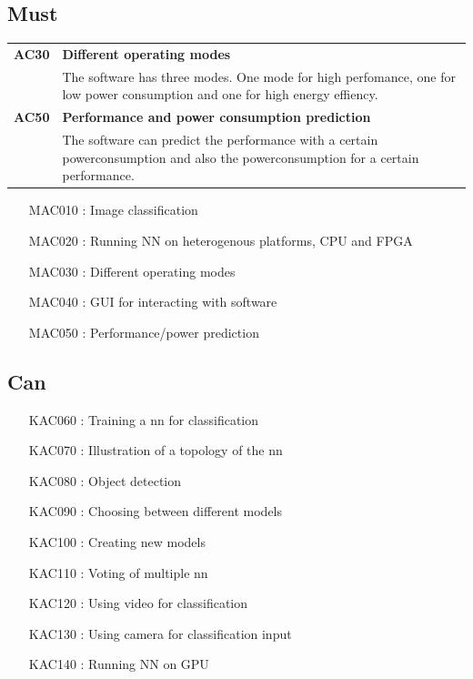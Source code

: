 \documentclass[parskip=full]{scrartcl}
\begin{document}
\subsection{Must}
\begin{tabular}{p{2cm}p{12cm}}
\textbf{AC30} & \textbf{Different operating modes} \\
& The software has three modes. One mode for high perfomance, one for low power consumption and one for high energy effiency. \\
\textbf{AC50} & \textbf{Performance and power consumption prediction}\\
& The software can predict the performance with a certain powerconsumption and also the powerconsumption for a certain performance.
\end{tabular}
\begin{itemize}[nosep]
\item [MAC010]: Image classification
\item [MAC020]: Running NN on heterogenous platforms, CPU and FPGA
\item [MAC030]: Different operating modes
\item [MAC040]: GUI for interacting with software
\item [MAC050]: Performance/power prediction
\end{itemize}

\subsection{Can}
\begin{itemize}[nosep]
\item [KAC060]: Training a nn for classification
\item [KAC070]: Illustration of a topology of the nn
\item [KAC080]: Object detection
\item [KAC090]: Choosing between different models
\item [KAC100]: Creating new models
\item [KAC110]: Voting of multiple nn
\item [KAC120]: Using video for classification
\item [KAC130]: Using camera for classification input
\item [KAC140]: Running NN on GPU
\end{itemize}
\end{document}

